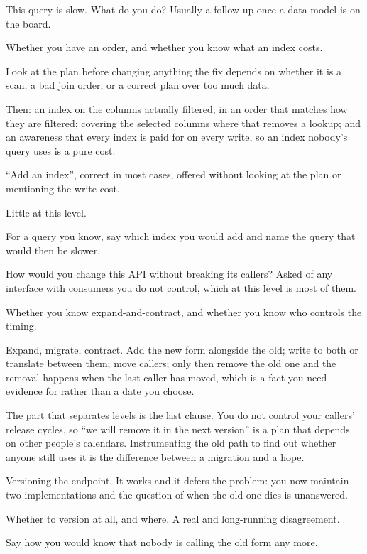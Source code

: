 \begin{bankq}{This query is slow. What do you do?}
\qasked
Usually a follow-up once a data model is on the board.

\qtested
Whether you have an order, and whether you know what an index costs.

\qstaff
Look at the plan before changing anything \dash{} the fix depends on whether it
is a scan, a bad join order, or a correct plan over too much data.

Then: an index on the columns actually filtered, in an order that matches how
they are filtered; covering the selected columns where that removes a lookup;
and an awareness that every index is paid for on every write, so an index
nobody's query uses is a pure cost.


\qsenior
``Add an index'', correct in most cases, offered without looking at the plan or
mentioning the write cost.

\qcontested
Little at this level.

\qdrill
For a query you know, say which index you would add and name the query that
would then be slower.
\end{bankq}

\begin{bankq}{How would you change this API without breaking its callers?}
\qasked
Asked of any interface with consumers you do not control, which at this level
is most of them.

\qtested
Whether you know expand-and-contract, and whether you know who controls the
timing.

\qstaff
Expand, migrate, contract. Add the new form alongside the old; write to both or
translate between them; move callers; only then remove the old one \dash{} and
the removal happens when the last caller has moved, which is a fact you need
evidence for rather than a date you choose.

The part that separates levels is the last clause. You do not control your
callers' release cycles, so ``we will remove it in the next version'' is a plan
that depends on other people's calendars. Instrumenting the old path to find
out whether anyone still uses it is the difference between a migration and a
hope.

\qsenior
Versioning the endpoint. It works and it defers the problem: you now maintain
two implementations and the question of when the old one dies is unanswered.

\qcontested
Whether to version at all, and where. A real and long-running disagreement.

\qdrill
Say how you would know that nobody is calling the old form any more.
\end{bankq}

